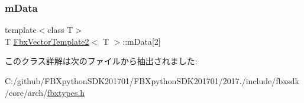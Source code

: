 \subsubsection{\texorpdfstring{m\+Data}{mData}}
{\footnotesize\ttfamily template$<$class T$>$ \\
T \hyperlink{class_fbx_vector_template2}{Fbx\+Vector\+Template2}$<$ T $>$\+::m\+Data\mbox{[}2\mbox{]}}



このクラス詳解は次のファイルから抽出されました\+:\begin{DoxyCompactItemize}
\item 
C\+:/github/\+F\+B\+Xpython\+S\+D\+K201701/\+F\+B\+Xpython\+S\+D\+K201701/2017./include/fbxsdk/core/arch/\hyperlink{fbxtypes_8h}{fbxtypes.\+h}\end{DoxyCompactItemize}

